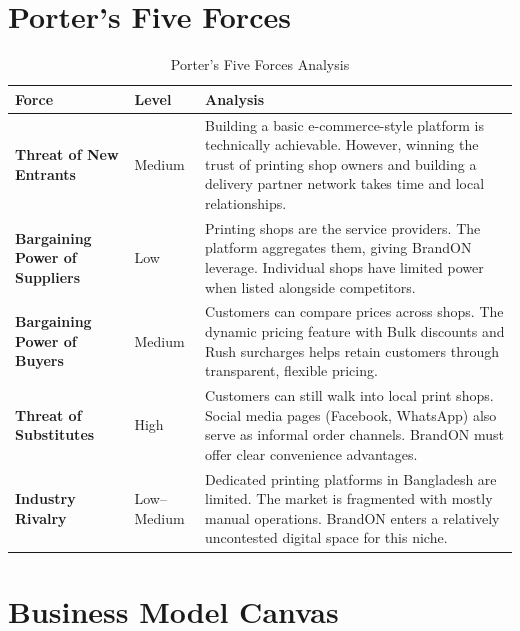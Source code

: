 \documentclass[12pt,a4paper]{report}
\begin{document}
\section{Porter's Five Forces}

\begin{table}[H]
  \centering
  \caption{Porter's Five Forces Analysis}
  \begin{tabularx}{\textwidth}{L{3.5cm} C{1.8cm} X}
    \toprule
    \textbf{Force} & \textbf{Level} & \textbf{Analysis} \\
    \midrule
    \textbf{Threat of New Entrants}
      & Medium
      & Building a basic e-commerce-style platform is technically achievable. However, winning the trust of printing shop owners and building a delivery partner network takes time and local relationships. \\
    \midrule
    \textbf{Bargaining Power of Suppliers}
      & Low
      & Printing shops are the service providers. The platform aggregates them, giving BrandON leverage. Individual shops have limited power when listed alongside competitors. \\
    \midrule
    \textbf{Bargaining Power of Buyers}
      & Medium
      & Customers can compare prices across shops. The dynamic pricing feature with Bulk discounts and Rush surcharges helps retain customers through transparent, flexible pricing. \\
    \midrule
    \textbf{Threat of Substitutes}
      & High
      & Customers can still walk into local print shops. Social media pages (Facebook, WhatsApp) also serve as informal order channels. BrandON must offer clear convenience advantages. \\
    \midrule
    \textbf{Industry Rivalry}
      & Low--Medium
      & Dedicated printing platforms in Bangladesh are limited. The market is fragmented with mostly manual operations. BrandON enters a relatively uncontested digital space for this niche. \\
    \bottomrule
  \end{tabularx}
\end{table}

\section{Business Model Canvas}
\end{document}
